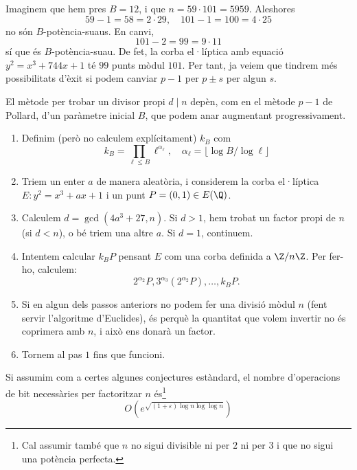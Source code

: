  

 \begin{example}
 Imaginem que hem pres $B=12$, i que $n=59\cdot 101 = 5959$. Aleshores
 \[
 59-1 = 58=2\cdot 29,\quad 101-1=100=4\cdot25
 \]
 no són $B$-potència-suaus. En canvi,
 \[
 101-2 = 99 = 9\cdot 11
 \]
 sí que és $B$-potència-suau. De fet, la corba el·líptica amb equació $y^2=x^3+744x+1$ té $99$ punts mòdul $101$. Per tant, ja veiem que tindrem més possibilitats d'èxit si podem canviar $p-1$ per $p\pm s$ per algun $s$.
 \end{example}
 
 El mètode per trobar un divisor propi $d\mid n$ depèn, com en el mètode $p-1$ de Pollard, d'un paràmetre inicial $B$, que podem anar augmentant progressivament.
 \begin{enumerate}
 \item Definim (però no calculem explícitament) $k_B$ com
 \[
 k_B=\prod_{\ell\leq B} \ell^{\alpha_\ell},\quad\alpha_\ell = \lfloor\log B/\log\ell\rfloor
 \]
     \item Triem un enter $a$ de manera aleatòria, i considerem la corba el·líptica $E\colon y^2=x^3+ax+1$ i un punt $P=(0,1)\in E(\Q)$.
     \item Calculem $d=\gcd(4a^3+27,n)$. Si $d>1$, hem trobat un factor propi de $n$ (si $d<n$), o bé triem una altre $a$. Si $d=1$, continuem.
     \item Intentem calcular $k_BP$ pensant $E$ com una corba definida a $\Z/n\Z$. Per fer-ho, calculem:
     \[
     2^{\alpha_2} P, 3^{\alpha_3}(2^{\alpha_2}P),\ldots, k_BP. 
     \]
     \item Si en algun dels passos anteriors no podem fer una divisió mòdul $n$ (fent servir l'algoritme d'Euclides), és perquè la quantitat que volem invertir no és coprimera amb $n$, i això ens donarà un factor.
     \item Tornem al pas $1$ fins que funcioni.
 \end{enumerate}
 
 \begin{theorem}[Lenstra]
 Si assumim com a certes algunes conjectures estàndard, el nombre d'operacions de bit necessàries per factoritzar $n$ és\footnote{Cal assumir també que $n$ no sigui divisible ni per $2$ ni per $3$ i que no sigui una potència perfecta.}
 \[
 O\left(e^{\sqrt{(1+\varepsilon)\log n \log\log n}}\right)
 \]
 \end{theorem}

